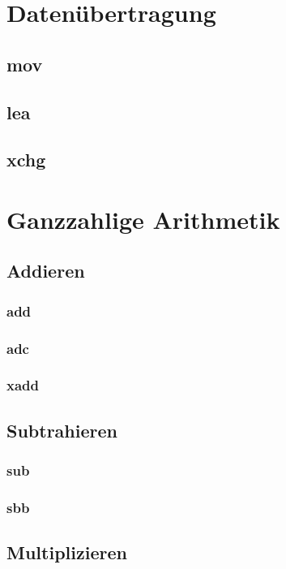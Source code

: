\documentclass[12pt, a4paper, utf8]{book}
\begin{document}
\chapter{Datenübertragung}
\section{mov}
\section{lea}
\section{xchg}
\chapter{Ganzzahlige Arithmetik}
\section{Addieren}
\subsection{add}
\subsection{adc}
\subsection{xadd}
\section{Subtrahieren}
\subsection{sub}
\subsection{sbb}
\section{Multiplizieren}
\end{document}
